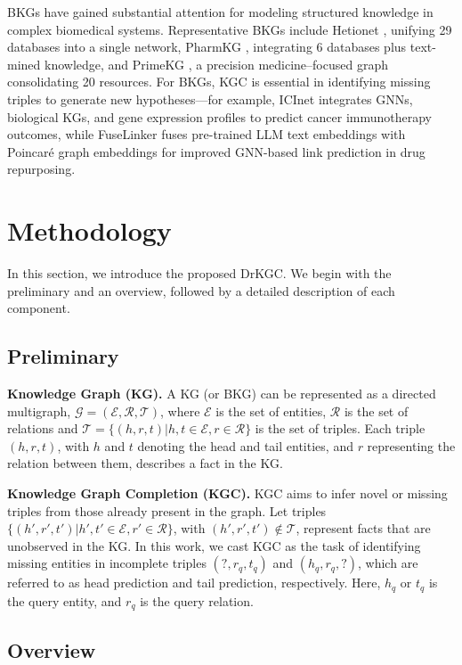 \documentclass[11pt]{article}
\begin{document}
BKGs have gained substantial attention for modeling structured knowledge in complex biomedical systems. Representative BKGs include Hetionet \citep{himmelstein2017systematic}, unifying 29 databases into a single network, PharmKG \citep{zheng2021pharmkg}, integrating 6 databases plus text-mined knowledge, and PrimeKG \citep{chandak2023building}, a precision medicine–focused graph consolidating 20 resources. For BKGs, KGC is essential in identifying missing triples to generate new hypotheses—for example, ICInet \citep{zhao2023biological} integrates GNNs, biological KGs, and gene expression profiles to predict cancer immunotherapy outcomes, while FuseLinker \citep{xiao2024fuselinker} fuses pre-trained LLM text embeddings with Poincaré graph embeddings for improved GNN-based link prediction in drug repurposing.


\section{Methodology}
In this section, we introduce the proposed DrKGC. We begin with the preliminary and an overview, followed by a detailed description of each component.

\subsection{Preliminary}
\noindent \textbf{Knowledge Graph (KG).} 
A KG (or BKG) can be represented as a directed multigraph, $\mathcal{G}=(\mathcal{E},\mathcal{R},\mathcal{T})$, where $\mathcal{E}$ is the set of entities, $\mathcal{R}$ is the set of relations and $\mathcal{T}=\{(h,r,t)|h,t \in \mathcal{E}, r \in \mathcal{R}\}$ is the set of triples. Each triple $(h,r,t)$, with $h$ and $t$ denoting the head and tail entities, and $r$ representing the relation between them, describes a fact in the KG.

\noindent \textbf{Knowledge Graph Completion (KGC).} 
KGC aims to infer novel or missing triples from those already present in the graph. Let triples $\{(h',r',t')|h',t' \in \mathcal{E}, r' \in \mathcal{R}\}$, with $(h',r',t') \notin \mathcal{T}$, represent facts that are unobserved in the KG.  In this work, we cast KGC as the task of identifying missing entities in incomplete triples $(?,r_q,t_q)$ and $(h_q,r_q,?)$, which are referred to as head prediction and tail prediction, respectively. Here, $h_q$ or $t_q$ is the query entity, and $r_q$ is the query relation.

\subsection{Overview}
\end{document}
